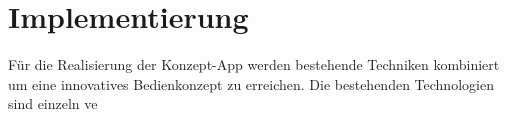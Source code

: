 \documentclass{article}
\begin{document}
\section{Implementierung}
\label{sec:implementierung}
Für die Realisierung der Konzept-App werden bestehende Techniken kombiniert um eine innovatives Bedienkonzept zu erreichen. Die bestehenden Technologien sind einzeln ve



 \cite{C2}



\end{document}
